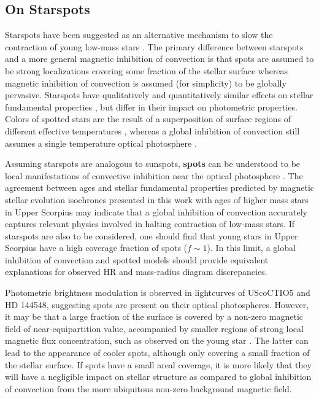\documentclass{aa}
\begin{document}
\subsection{On Starspots}
Starspots have been suggested as an alternative mechanism to slow the contraction of young low-mass stars \citep{Jackson2009, MM10, Jackson2014a, Somers2015b}. The primary difference between starspots and a more general magnetic inhibition of convection is that spots are assumed to be strong localizations covering some fraction of the stellar surface whereas magnetic inhibition of convection is assumed (for simplicity) to be globally pervasive. Starspots have qualitatively and quantitatively similar effects on stellar fundamental properties \citep[radius, \teff, luminosity;][]{Spruit1982a,Spruit1986,Somers2015b}, but differ in their impact on photometric properties. Colors of spotted stars are the result of a superposition of surface regions of different effective temperatures \citep{Spruit1986}, whereas a global inhibition of convection still assumes a single temperature optical photosphere \citep{Jackson2014a}.

Assuming starspots are analogous to sunspots, {\bf spots} can be understood to be local manifestations of convective inhibition near the optical photosphere \citep{Biermann1941,Deinzer1965}. The agreement between ages and stellar fundamental properties predicted by magnetic stellar evolution isochrones presented in this work with ages of higher mass stars in Upper Scorpius may indicate that a global inhibition of convection accurately captures relevant physics involved in halting contraction of low-mass stars. If starspots are also to be considered, one should find that young stars in Upper Scorpius have a high coverage fraction of spots ($f \sim 1$). In this limit, a global inhibition of convection and spotted models \citep[e.g.,][]{Somers2015b} should provide equivalent explanations for observed HR and mass-radius diagram discrepancies.

Photometric brightness modulation is observed in lightcurves of UScoCTIO5 and HD 144548, suggesting spots are present on their optical photospheres. However, it may be that a large fraction of the surface is covered by a non-zero magnetic field of near-equipartition value, accompanied by smaller regions of strong local magnetic flux concentration, such as observed on the young star  \citep{Shulyak2014}. The latter can lead to the appearance of cooler spots, although only covering a small fraction of the stellar surface. If spots have a small areal coverage, it is more likely that they will have a negligible impact on stellar structure as compared to global inhibition of convection from the more ubiquitous non-zero background magnetic field.
\end{document}
